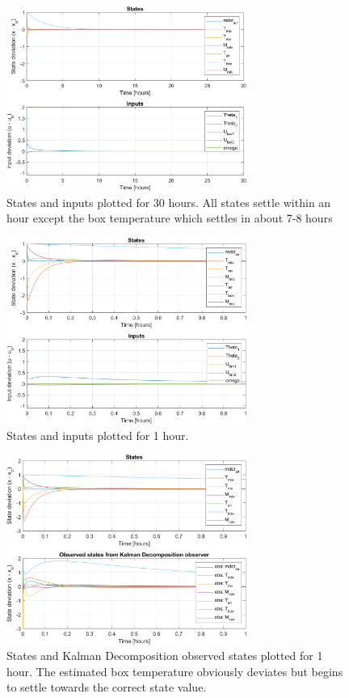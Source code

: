 \begin{figure}[h!]
	\centering
	\includegraphics[width=0.7\textwidth]{Graphics/fig_stateInput30h.png}
	\caption{States and inputs plotted for 30 hours. All states settle within an hour except the box temperature which settles in about 7-8 hours}
	\label{fig:sim_stateInput30h}
\end{figure}

\begin{figure}[h!]
	\centering
	\includegraphics[width=0.7\textwidth]{Graphics/fig_stateInput1h.png}
	\caption{States and inputs plotted for 1 hour.}
	\label{fig:sim_stateInput1h}
\end{figure}

\begin{figure}[h!]
	\centering
	\includegraphics[width=0.7\textwidth]{Graphics/fig_stateObsState1h.png}
	\caption{States and Kalman Decomposition observed states plotted for 1 hour. The estimated box temperature obviously deviates but begins to settle towards the correct state value.}
	\label{fig:sim_stateObsState1h}
\end{figure}

